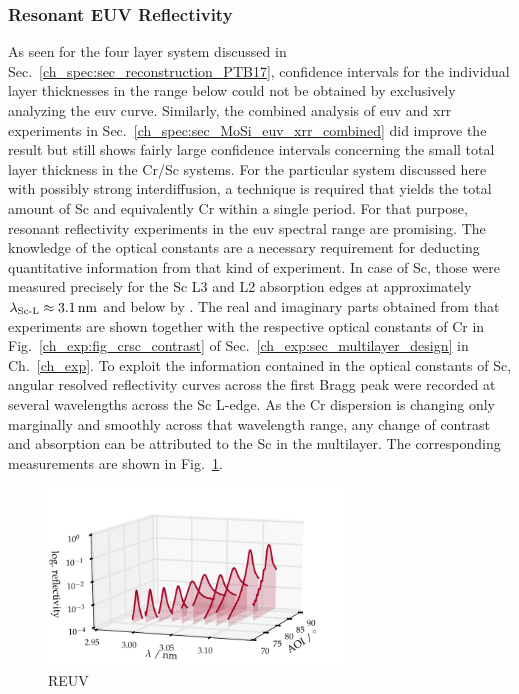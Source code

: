 \subsubsection{Resonant EUV Reflectivity}
As seen for the four layer system discussed in Sec.~\ref{ch_spec:sec_reconstruction_PTB17}, confidence intervals for the individual layer thicknesses in the range below  could not be obtained by exclusively analyzing the \gls{euv} curve. Similarly, the combined analysis of \gls{euv} and \gls{xrr} experiments in Sec.~\ref{ch_spec:sec_MoSi_euv_xrr_combined} did improve the result but still shows fairly large confidence intervals concerning the small total layer thickness in the Cr/Sc systems. For the particular system discussed here with possibly strong interdiffusion, a technique is required that yields the total amount of Sc and equivalently Cr within a single period. For that purpose, resonant reflectivity experiments in the \gls{euv} spectral range are promising. The knowledge of the optical constants are a necessary requirement for deducting quantitative information from that kind of experiment. In case of Sc, those were measured precisely for the Sc L3 and L2 absorption edges at approximately $\lambda_\text{Sc-L} \approx \nm{3.1}$ and below by \textcite{aquila_measurements_2004}. The real and imaginary parts obtained from that experiments are shown together with the respective optical constants of Cr in Fig.~\ref{ch_exp:fig_crsc_contrast} of Sec.~\ref{ch_exp:sec_multilayer_design} in  Ch.~\ref{ch_exp}. To exploit the information contained in the optical constants of Sc, angular resolved reflectivity curves across the first Bragg peak were recorded at several wavelengths across the Sc L-edge. As the Cr dispersion is changing only marginally and smoothly across that wavelength range, any change of contrast and absorption can be attributed to the Sc in the multilayer. The corresponding measurements are shown in Fig.~\ref{ch_spec:fig_CrSc_REUV_data}.
\begin{figure}[htbp]
  \centering
  \includegraphics[width=0.7\textwidth]{img/CrSc_REUV_data}
  \caption{REUV}
  \label{ch_spec:fig_CrSc_REUV_data}
\end{figure}
